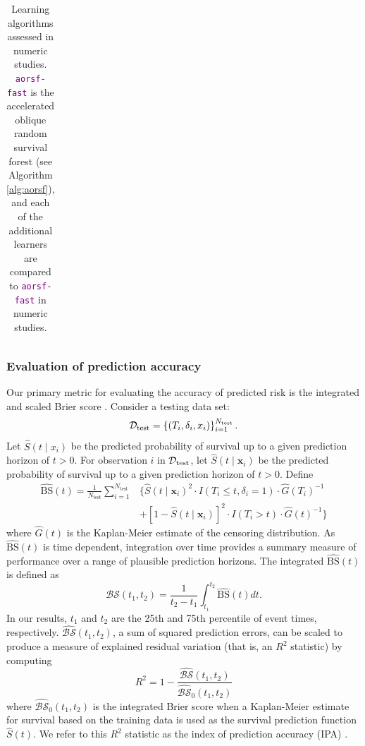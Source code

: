 \documentclass[twoside,11pt]{article}\usepackage[]{graphicx}\usepackage[]{xcolor}
\newcommand{\dataset}{{\cal D}}
\newcommand{\ie}{that is}
\newcommand{\bstat}{\widehat{\text{BS}}(t)}
\newcommand{\bsbar}{\mathcal{\widehat{BS}}(t_1, t_2)}
\newcommand{\bskap}{\mathcal{\widehat{BS}}_0(t_1, t_2)}
\newcommand{\ntest}{N_{\text{test}}}
\begin{document}
\begin{landscape}
\begin{table}[h!]
\begin{tabular}{p{2cm} | p{3cm} p{4cm} p{12cm}}
\end{tabular}
\caption{Learning algorithms assessed in numeric studies. \textcolor{purple}{\texttt{aorsf-fast}} is the accelerated oblique random survival forest (see Algorithm \ref{alg:aorsf}), and each of the additional learners are compared to \textcolor{purple}{\texttt{aorsf-fast}} in numeric studies.}
\label{tab:learners}
\end{table}

\end{landscape}
\restoregeometry



\subsubsection{Evaluation of prediction accuracy} \label{sec:prediction_accuracy}

Our primary metric for evaluating the accuracy of predicted risk is the integrated and scaled Brier score \citep{graf1999assessment}. Consider a testing data set:
$$\dataset_{\text{test}} = \left\{ (T_i, \delta_i, x_{i}) \right\}_{i=1}^{N_{\text{test}}}.$$
Let $\widehat{S}(t \mid x_i)$ be the predicted probability of survival up to a given prediction horizon of $t > 0$.
 For observation $i$ in $\dataset_{\text{test}}$, let $\widehat{S}(t \mid \bm{x}_i)$ be the predicted probability of survival up to a given prediction horizon of $t > 0$. Define \begin{align*}
\bstat = \frac{1}{\ntest} \sum_{i=1}^{\ntest} &\{ \widehat{S}(t \mid \bm{x}_i)^2 \cdot I(T_i \leq t, \delta_i = 1) \cdot \widehat{G}(T_i)^{-1} \\ &+ [1-\widehat{S}(t \mid \bm{x}_i)]^2 \cdot I(T_i > t) \cdot \widehat{G}(t)^{-1}\}
\end{align*} where $\widehat{G}(t)$ is the Kaplan-Meier estimate of the censoring distribution. As $\bstat$ is time dependent, integration over time provides a summary measure of performance over a range of plausible prediction horizons. The integrated $\bstat$ is defined as \begin{equation}
\bsbar = \frac{1}{t_2 - t_1}\int_{t_1}^{t_2} \widehat{\text{BS}}(t) dt.
\end{equation} In our results, $t_1$ and $t_2$ are the 25th and 75th percentile of event times, respectively. $\bsbar$, a sum of squared prediction errors, can be scaled to produce a measure of explained residual variation (\ie, an $R^2$ statistic) by computing \begin{equation}
R^2 = 1 - \frac{\bsbar}{\bskap}
\end{equation} where $\bskap$ is the integrated Brier score when a Kaplan-Meier estimate for survival based on the training data is used as the survival prediction function $\widehat{S}(t)$. We refer to this $R^2$ statistic as the index of prediction accuracy (IPA) \citep{kattan2018index}.
\end{document}
